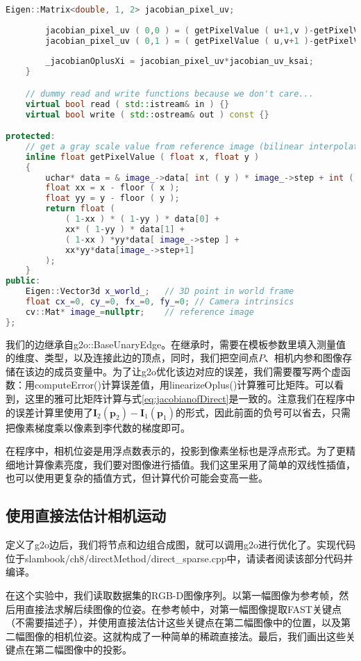 \begin{lstlisting}[language=c++,caption=slambook/ch8/directMethod/direct\_sparse.cpp（片段）]
		Eigen::Matrix<double, 1, 2> jacobian_pixel_uv;
		
		jacobian_pixel_uv ( 0,0 ) = ( getPixelValue ( u+1,v )-getPixelValue ( u-1,v ) ) /2;
		jacobian_pixel_uv ( 0,1 ) = ( getPixelValue ( u,v+1 )-getPixelValue ( u,v-1 ) ) /2;
		
		_jacobianOplusXi = jacobian_pixel_uv*jacobian_uv_ksai;
	}

	// dummy read and write functions because we don't care...
	virtual bool read ( std::istream& in ) {}
	virtual bool write ( std::ostream& out ) const {}

protected:
	// get a gray scale value from reference image (bilinear interpolated)
	inline float getPixelValue ( float x, float y )
	{
		uchar* data = & image_->data[ int ( y ) * image_->step + int ( x ) ];
		float xx = x - floor ( x );
		float yy = y - floor ( y );
		return float (
			( 1-xx ) * ( 1-yy ) * data[0] +
			xx* ( 1-yy ) * data[1] +
			( 1-xx ) *yy*data[ image_->step ] +
			xx*yy*data[image_->step+1]
		);
	}
public:
	Eigen::Vector3d x_world_;   // 3D point in world frame
	float cx_=0, cy_=0, fx_=0, fy_=0; // Camera intrinsics
	cv::Mat* image_=nullptr;    // reference image
};
\end{lstlisting}

我们的边继承自g2o::BaseUnaryEdge。在继承时，需要在模板参数里填入测量值的维度、类型，以及连接此边的顶点，同时，我们把空间点$P$、相机内参和图像存储在该边的成员变量中。为了让g2o优化该边对应的误差，我们需要覆写两个虚函数：用computeError()计算误差值，用linearizeOplus()计算雅可比矩阵。可以看到，这里的雅可比矩阵计算与式\eqref{eq:jacobianofDirect}是一致的。注意我们在程序中的误差计算里使用了$\bm{I}_2(\bm{p}_2) - \bm{I}_1(\bm{p}_1)$的形式，因此前面的负号可以省去，只需把像素梯度乘以像素到李代数的梯度即可。

在程序中，相机位姿是用浮点数表示的，投影到像素坐标也是浮点形式。为了更精细地计算像素亮度，我们要对图像进行插值。我们这里采用了简单的双线性插值，也可以使用更复杂的插值方式，但计算代价可能会变高一些。

\subsection{使用直接法估计相机运动}
定义了g2o边后，我们将节点和边组合成图，就可以调用g2o进行优化了。实现代码位于slambook/ch8/directMethod/direct\_sparse.cpp中，请读者阅读该部分代码并编译。

在这个实验中，我们读取数据集的RGB-D图像序列。以第一幅图像为参考帧，然后用直接法求解后续图像的位姿。在参考帧中，对第一幅图像提取FAST关键点（不需要描述子），并使用直接法估计这些关键点在第二幅图像中的位置，以及第二幅图像的相机位姿。这就构成了一种简单的稀疏直接法。最后，我们画出这些关键点在第二幅图像中的投影。

